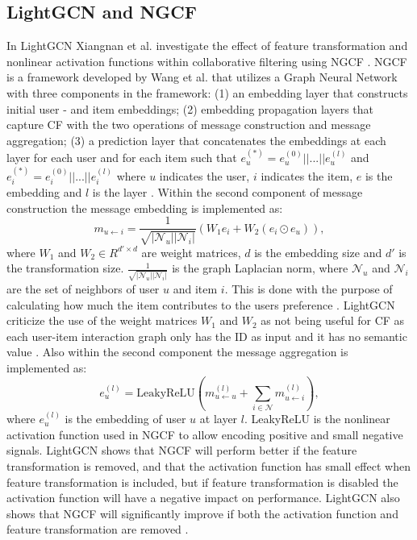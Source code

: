 \subsection{LightGCN and NGCF}\label{subsec:lightgcn-ngcf}
In LightGCN Xiangnan et al. investigate the effect of feature transformation and nonlinear activation functions within collaborative filtering using NGCF \cite{lightgcn}.
NGCF is a framework developed by Wang et al. \cite{NGCF_2019} that utilizes a Graph Neural Network with three components in the framework: (1) an embedding layer that constructs initial user - and item embeddings; (2) embedding propagation layers that capture CF with the two operations of message construction and message aggregation; (3) a prediction layer that concatenates the embeddings at each layer for each user and for each item such that $e_{u}^{(*)} = e_{u}^{(0)}||...||e_{u}^{(l)}$ and $e_{i}^{(*)} = e_{i}^{(0)}||...||e_{i}^{(l)}$ where $u$ indicates the user, $i$ indicates the item, $e$ is the embedding and $l$ is the layer \cite{NGCF_2019}.
Within the second component of message construction the message embedding is implemented as:
\begin{equation}
    m_{u \leftarrow i} = \frac{1}{\sqrt{|\mathcal{N}_u||\mathcal{N}_i|}}(W_1e_i + W_2(e_i \odot e_u)),
    \label{eq:message-construction}
\end{equation}
where $W_1$ and $W_2 \in R^{d' \times d}$ are weight matrices, $d$ is the embedding size and $d'$ is the transformation size.
$\frac{1}{\sqrt{|\mathcal{N}_u||\mathcal{N}_i|}}$ is the graph Laplacian norm, where $\mathcal{N}_u$ and $\mathcal{N}_i$ are the set of neighbors of user $u$ and item $i$.
This is done with the purpose of calculating how much the item contributes to the users preference \cite{NGCF_2019}.
LightGCN criticize the use of the weight matrices $W_1$ and $W_2$ as not being useful for CF as each user-item interaction graph only has the ID as input and it has no semantic value \cite{lightgcn}.
Also within the second component the message aggregation is implemented as:
\begin{equation}
    e_{u}^{(l)} = \mbox{LeakyReLU}(m^{(l)}_{u \leftarrow u} + \sum^{}_{i \in \mathcal{N}} m^{(l)}_{u \leftarrow i}),
\end{equation}
where $e_{u}^{(l)}$ is the embedding of user $u$ at layer $l$.
LeakyReLU is the nonlinear activation function used in NGCF to allow encoding positive and small negative signals.
LightGCN shows that NGCF will perform better if the feature transformation is removed, and that the activation function has small effect when feature transformation is included, but if feature transformation is disabled the activation function will have a negative impact on performance.
LightGCN also shows that NGCF will significantly improve if both the activation function and feature transformation are removed \cite{lightgcn}.
